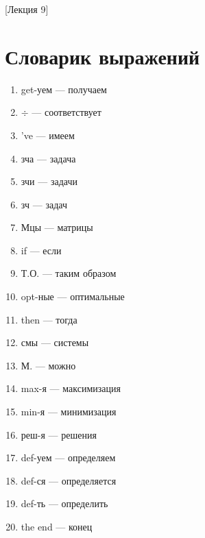 [Лекция 9]

\newpage

\section{Словарик выражений}
\begin{enumerate}
    \item get-уем --- получаем
    \item $\div$ --- соответствует
    \item 've --- имеем
    \item зча --- задача
    \item зчи ---  задачи
    \item зч --- задач
    \item Мцы --- матрицы
    \item if --- если
    \item Т.О. --- таким образом
    \item opt-ные --- оптимальные
    \item then --- тогда
    \item смы --- системы
    \item М. --- можно
    \item max-я --- максимизация
    \item min-я --- минимизация
    \item реш-я --- решения
    \item def-уем --- определяем
    \item def-ся --- определяется
    \item def-ть --- определить
    \item the end --- конец
\end{enumerate}
